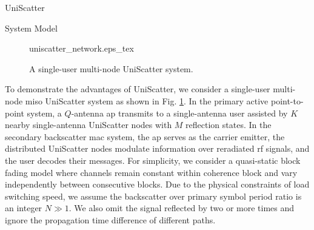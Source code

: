 \documentclass[journal]{IEEEtran}
\begin{document}
\begin{section}{UniScatter}
	\begin{subsection}{System Model}
		\begin{figure}[!t]
			\centering
			\def\svgwidth{0.8\columnwidth}
			\footnotesize{
				{uniscatter_network.eps_tex}
			}
			\caption{A single-user multi-node UniScatter system.}
			\label{fi:uniscatter_network}
		\end{figure}
		To demonstrate the advantages of UniScatter, we consider a single-user multi-node \gls{miso} UniScatter system as shown in Fig. \ref{fi:uniscatter_network}.
		In the primary active point-to-point system, a $Q$-antenna \gls{ap} transmits to a single-antenna user assisted by $K$ nearby single-antenna UniScatter nodes with $M$ reflection states.
		In the secondary backscatter \gls{mac} system, the \gls{ap} serves as the carrier emitter, the distributed UniScatter nodes modulate information over reradiated \gls{rf} signals, and the user decodes their messages.
		For simplicity, we consider a quasi-static block fading model where channels remain constant within coherence block and vary independently between consecutive blocks.
		Due to the physical constraints of load switching speed, we assume the backscatter over primary symbol period ratio is an integer $N \gg 1$.
		We also omit the signal reflected by two or more times and ignore the propagation time difference of different paths.


\end{subsection}
\end{section}
\end{document}
